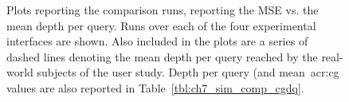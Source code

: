 \begin{figure}[t!]
    \centering
    \caption[Comparison plots (result summaries)]{Plots reporting the comparison runs, reporting the MSE vs. the mean depth per query. Runs over each of the four experimental interfaces are shown. Also included in the plots are a series of dashed lines denoting the mean depth per query reached by the real-world subjects of the user study. Depth per query (and mean~\gls{acr:cg} values are also reported in Table~\ref{tbl:ch7_sim_comp_cgdq}.}
    \label{fig:ch7_sim_comparison_plots}
\end{figure}

